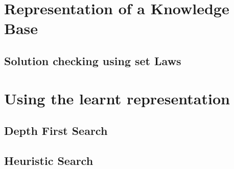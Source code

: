 \section{Representation of a Knowledge Base}
\subsection{Solution checking using set Laws}



\section{Using the learnt representation}
\subsection{Depth First Search}
\subsection{Heuristic Search}



